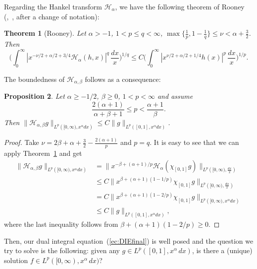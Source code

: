 \documentclass[12pt,leqno]{amsart}
\theoremstyle{plain}
\newtheorem{Thm}{Theorem}[section]
\newtheorem{Pro}[Thm]{Proposition}
\newcommand{\lpnorm}[3]{\|{#1}\|_{L^{#2}({#3})}} %
\newcommand{\htra}{\mathcal{H}_\alpha} %
\newcommand{\hab}{\mathcal{H}_{\alpha,\beta}}
\begin{document}
Regarding the Hankel transform $\htra$, we have the following theorem of
Rooney (\cite[p.~1100]{Roo},~\cite{H-R}, after a change of notation):

\begin{Thm}[Rooney]
\label{th:Rooney}
Let $\alpha>-1$, $1 < p \leq q < \infty$, $\max\{\tfrac1p,1-\tfrac1{q}\} \le
\nu < \alpha+\tfrac32$. Then
\begin{equation*}
    \Big( \int_0^{\infty} |x^{-\nu/2+\alpha/2+3/4}\htra(h,x)|^q
        \, \frac{dx}x \Big)^{1/q}
      \le C \Big( \int_0^{\infty} |x^{\nu/2+\alpha/2+1/4}h(x)|^p \,\frac{dx}x
        \Big)^{1/p}.
\end{equation*}
\end{Thm}

The boundedness of $\hab$ follows as a consequence:

\begin{Pro}
\label{pro:acotHab}
Let $\alpha \ge -1/2$, $\beta \ge 0$, $1<p<\infty$ and assume
\begin{equation*}
    \frac{2(\alpha+1)}{\alpha+\beta+1} \le p < \frac{\alpha+1}{\beta}.
\end{equation*}
Then $\lpnorm{\hab g}p{[0,\infty),x^{\alpha}dx} \le C
\lpnorm{g}p{[0,1],x^{\alpha}dx}$.
\end{Pro}

\begin{proof} Take $\nu = 2 \beta + \alpha + \tfrac32 - \tfrac{2(\alpha+1)}p$
and $p=q$. It is easy to see that we can apply Theorem~\ref{th:Rooney} and get
\begin{align*}
   \lpnorm{\hab g}p{[0,\infty),x^{\alpha}dx}
   &= \lpnorm{x^{-\beta+(\alpha+1)/p}
   \htra(\chi_{[0,1]}g)}p{[0,\infty),\frac{dx}x}
   \\
   &\le C
   \lpnorm{x^{\beta+(\alpha+1)(1-1/p)}\chi_{[0,1]}g}p{[0,\infty),\frac{dx}x}
   \\
    &= C
  \lpnorm{x^{\beta+(\alpha+1)(1-2/p)}\chi_{[0,1]}g}p{[0,\infty),x^{\alpha}dx}
   \\
    &\le C \lpnorm{g}p{[0,1],x^{\alpha}dx},
\end{align*}
where the last inequality follows from $\beta+(\alpha+1)(1-2/p) \ge 0$.
\end{proof}

Then, our dual integral equation~(\ref{ec:DIEfinal}) is well posed and the
question we try to solve is the following: given any $g \in
L^p([0,1],x^{\alpha}\,dx)$, is there a (unique) solution $f \in
L^p([0,\infty),x^{\alpha}\,dx)$?

\end{document}
